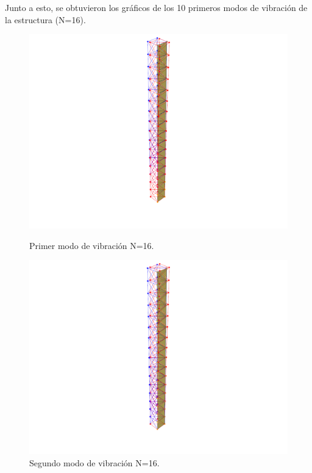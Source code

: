 Junto a esto, se obtuvieron los gráficos de los 10 primeros modos de vibración de la estructura (N=16).

\begin{figure}[H]
    \begin{minipage}[b]{0.5\textwidth}
        \centering
        \includegraphics[width=\textwidth]{FOTOS/mod1_16.png}
        \caption{Primer modo de vibración N=16.}
    \end{minipage}
    \hfill
    \begin{minipage}[b]{0.5\textwidth}
        \centering
        \includegraphics[width=\textwidth]{FOTOS/mod2_16.png}
        \caption{Segundo modo de vibración N=16.}
    \end{minipage}
\end{figure}

